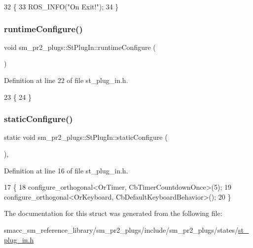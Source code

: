 \begin{DoxyCode}
32     \{
33         ROS\_INFO(\textcolor{stringliteral}{"On Exit!"});
34     \}
\end{DoxyCode}
\mbox{\label{structsm__pr2__plugs_1_1StPlugIn_a21411a3a1c4fa85a7bad312cf01b0d9a}} 
\subsubsection{\texorpdfstring{runtime\+Configure()}{runtimeConfigure()}}
{\footnotesize\ttfamily void sm\+\_\+pr2\+\_\+plugs\+::\+St\+Plug\+In\+::runtime\+Configure (\begin{DoxyParamCaption}{ }\end{DoxyParamCaption})\hspace{0.3cm}{\ttfamily [inline]}}



Definition at line 22 of file st\+\_\+plug\+\_\+in.\+h.


\begin{DoxyCode}
23     \{
24     \}
\end{DoxyCode}
\mbox{\label{structsm__pr2__plugs_1_1StPlugIn_a9098d683bdfaed2a78da207828faa227}} 
\subsubsection{\texorpdfstring{static\+Configure()}{staticConfigure()}}
{\footnotesize\ttfamily static void sm\+\_\+pr2\+\_\+plugs\+::\+St\+Plug\+In\+::static\+Configure (\begin{DoxyParamCaption}{ }\end{DoxyParamCaption})\hspace{0.3cm}{\ttfamily [inline]}, {\ttfamily [static]}}



Definition at line 16 of file st\+\_\+plug\+\_\+in.\+h.


\begin{DoxyCode}
17     \{
18         configure\_orthogonal<OrTimer,  CbTimerCountdownOnce>(5);    
19         configure\_orthogonal<OrKeyboard, CbDefaultKeyboardBehavior>();
20     \}
\end{DoxyCode}


The documentation for this struct was generated from the following file\+:\begin{DoxyCompactItemize}
\item 
smacc\+\_\+sm\+\_\+reference\+\_\+library/sm\+\_\+pr2\+\_\+plugs/include/sm\+\_\+pr2\+\_\+plugs/states/\hyperlink{st__plug__in_8h}{st\+\_\+plug\+\_\+in.\+h}\end{DoxyCompactItemize}
